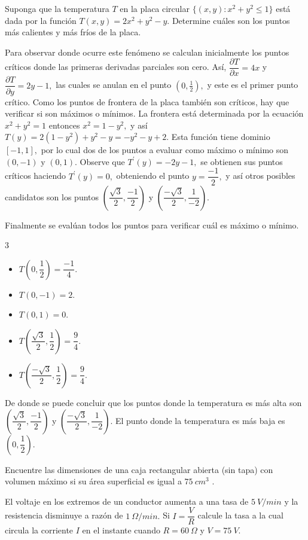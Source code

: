 \begin{prob}
Suponga que la temperatura $T$ en la placa circular $\{  (x,y): x^2+y^2\leq 1 \}$ está dada por la función $T(x,y)=2x^2+y^2-y.$ Determine cuáles son los puntos más calientes y más fríos de la placa.
\begin{myproof} 
Para observar donde ocurre este fenómeno se calculan inicialmente los puntos críticos  donde las primeras derivadas parciales son cero. 
Así, $\dfrac{\partial T}{\partial x}=4x$ y $\dfrac{\partial T}{\partial y}=2y-1,$ las cuales se anulan en el punto $(0,\frac{1}{2}),$ y este es el primer punto crítico. 
Como los puntos de frontera  de la placa también son críticos, hay que verificar si son máximos o mínimos. La frontera está determinada por la ecuación $x^2+y^2=1$ entonces $x^2=1-y^2,$ y así $T(y)=2(1-y^2)+y^2-y=-y^2-y+2.$ Esta función tiene dominio $\left[-1,1\right],$ por lo cual dos de los puntos a evaluar como máximo o mínimo son $(0,-1)$ y $(0,1).$
Observe que $T^{\prime}(y)=-2y-1,$ se obtienen sus puntos críticos haciendo  $T^{\prime}(y)=0,$ obteniendo el punto $y=\dfrac{-1}{2},$ y así otros posibles candidatos son los puntos $\left( \dfrac{\sqrt{3}}{2}, \dfrac{-1}{2} \right)$ y $\left( \dfrac{-\sqrt{3}}{2}, \dfrac{1}{-2} \right).$ 
 
 Finalmente se evalúan todos los puntos para verificar cuál es máximo o mínimo.
 \begin{multicols}{3}
 \begin{itemize}
 \item $T\left(0,\dfrac{1}{2}\right)=\dfrac{-1}{4}.$
 \item $T\left(0,-1\right)=2.$
 \item $T\left(0,1\right)=0.$
 \item $T\left(\dfrac{\sqrt{3}}{2},\dfrac{1}{2}\right)=\dfrac{9}{4}.$
  \item $T\left(\dfrac{-\sqrt{3}}{2},\dfrac{1}{2}\right)=\dfrac{9}{4}.$
 \end{itemize}
\end{multicols}
De donde se puede concluir que los puntos donde la temperatura es más alta son $\left( \dfrac{\sqrt{3}}{2}, \dfrac{-1}{2} \right)$ y $\left( \dfrac{-\sqrt{3}}{2}, \dfrac{1}{-2} \right).$ El punto donde la temperatura es más baja es  $\left(0,\dfrac{1}{2}\right).$
\end{myproof}
\end{prob}

\begin{prob}
Encuentre las dimensiones de una caja rectangular abierta (sin tapa) con volumen máximo si su área superficial es igual a $75\ cm^3$ .
\end{prob}

\begin{prob}
El voltaje en los extremos de un conductor aumenta a una tasa de $5\  V/min$ y la resistencia disminuye a razón de $1\ \Omega/min.$ Si $I=\dfrac{V}{R}$ calcule la tasa a la cual circula la corriente $I$ en el instante cuando $R=60\ \Omega$ y $V=75\ V.$
\end{prob}

